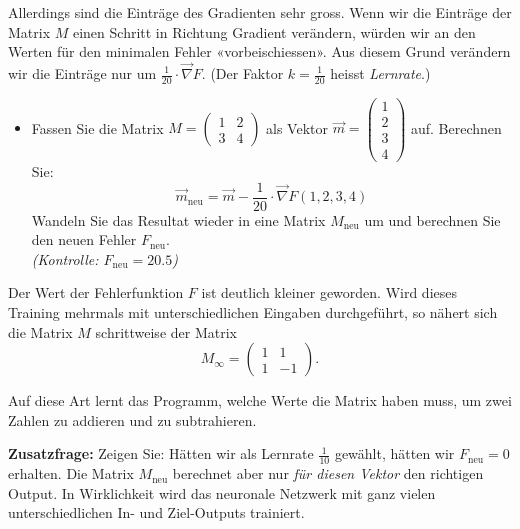 \begin{LA}
	\medskip

	Allerdings sind die Einträge des Gradienten sehr gross.
	Wenn wir die Einträge der Matrix \( M \) einen Schritt in Richtung Gradient verändern, würden wir an den Werten für den minimalen Fehler «vorbeischiessen».
	Aus diesem Grund verändern wir die Einträge nur um \( \frac{1}{20} \cdot \vec{\nabla}F \).
	(Der Faktor \( k = \frac{1}{20} \) heisst \emph{Lernrate}.)

	\begin{itemize}
		\item Fassen Sie die Matrix \( M = \begin{pmatrix} 1 & 2 \\ 3 & 4 \end{pmatrix} \) als Vektor \( \vec{m} = \begin{pmatrix} 1 \\ 2 \\ 3 \\ 4 \end{pmatrix} \) auf. Berechnen Sie:
		      \[
			      \vec{m}_{\text{neu}} = \vec{m} - \frac{1}{20} \cdot \vec{\nabla}F(1,2,3,4)
		      \]
		      Wandeln Sie das Resultat wieder in eine Matrix \( M_{\text{neu}} \) um und berechnen Sie den neuen Fehler \( F_{\text{neu}} \).\\
		      \textit{(Kontrolle: \( F_{\text{neu}} = 20.5 \))}
	\end{itemize}

	Der Wert der Fehlerfunktion \( F \) ist deutlich kleiner geworden.
	Wird dieses Training mehrmals mit unterschiedlichen Eingaben durchgeführt, so nähert sich die Matrix \( M \) schrittweise der Matrix
	\[
		M_\infty = \begin{pmatrix} 1 & 1 \\ 1 & -1 \end{pmatrix}.
	\]

	Auf diese Art lernt das Programm, welche Werte die Matrix haben muss, um zwei Zahlen zu addieren und zu subtrahieren.

	\bigskip

	\textbf{Zusatzfrage:}
	Zeigen Sie: Hätten wir als Lernrate \( \frac{1}{10} \) gewählt, hätten wir \( F_{\text{neu}} = 0 \) erhalten.
	Die Matrix \( M_{\text{neu}} \) berechnet aber nur \emph{für diesen Vektor} den richtigen Output.
	In Wirklichkeit wird das neuronale Netzwerk mit ganz vielen unterschiedlichen In- und Ziel-Outputs trainiert.

\end{LA}

























